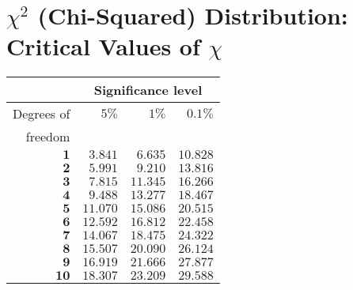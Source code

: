 \section{$\chi^2$ (Chi-Squared) Distribution: Critical Values of $\chi$}

\renewcommand{\arraystretch}{1.4}
\changefontsizes{6pt}

\begin{longtable}{|r|r|r|r|}
    \hline
    \rowcolor{gray!30}
    & \multicolumn{3}{c|}{Significance level} \\ \hline
    \rowcolor{gray!30}
    Degrees of & $5\%$ & $1\%$ & $0.1\%$ \\
    \rowcolor{gray!30}
    freedom & & & \\ \hline

    \(\mathbf{1}\) & \(3.841\) & \(6.635\) & \(10.828\) \\ \hline
    \(\mathbf{2}\) & \(5.991\) & \(9.210\) & \(13.816\) \\ \hline
    \(\mathbf{3}\) & \(7.815\) & \(11.345\) & \(16.266\) \\ \hline
    \(\mathbf{4}\) & \(9.488\) & \(13.277\) & \(18.467\) \\ \hline
    \(\mathbf{5}\) & \(11.070\) & \(15.086\) & \(20.515\) \\ \hline
    \(\mathbf{6}\) & \(12.592\) & \(16.812\) & \(22.458\) \\ \hline
    \(\mathbf{7}\) & \(14.067\) & \(18.475\) & \(24.322\) \\ \hline
    \(\mathbf{8}\) & \(15.507\) & \(20.090\) & \(26.124\) \\ \hline
    \(\mathbf{9}\) & \(16.919\) & \(21.666\) & \(27.877\) \\ \hline
    \(\mathbf{10}\) & \(18.307\) & \(23.209\) & \(29.588\) \\ \hline
\end{longtable}

\renewcommand{\arraystretch}{1}
\changefontsizes{11pt}

